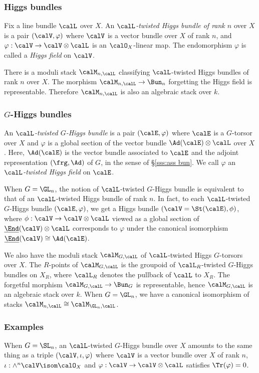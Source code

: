 \subsubsection{Higgs bundles} Fix a line bundle $\calL$ over $X$. An {\em $\calL$-twisted Higgs bundle of rank $n$} over $X$  is a pair $(\calV,\varphi)$ where $\calV$ is a vector bundle over $X$ of rank $n$, and $\varphi:\calV\to\calV\otimes\calL$ is an $\calO_{X}$-linear map. The endomorphism $\varphi$ is called a {\em Higgs field} on $\calV$.

There is a moduli stack $\calM_{n,\calL}$ classifying $\calL$-twisted Higgs bundles of rank $n$ over $X$. The morphism $\calM_{n,\calL}\to \Bun_{n}$ forgetting the Higgs field is representable. Therefore $\calM_{n,\calL}$ is also an algebraic stack over $k$.


\subsubsection{$G$-Higgs bundles} An {\em $\calL$-twisted $G$-Higgs bundle} is a pair $(\calE,\varphi)$ where $\calE$ is a $G$-torsor over $X$ and $\varphi$ is a global section of the vector bundle $\Ad(\calE)\otimes\calL$ over $X$. Here, $\Ad(\calE)$ is the vector bundle associated to $\calE$ and the adjoint representation $(\frg,\Ad)$ of $G$, in the sense of \S\ref{sss:ass bun}. We call $\varphi$ an {\em $\calL$-twisted Higgs field} on $\calE$.

When $G=\GL_{n}$, the notion of $\calL$-twisted $G$-Higgs bundle is equivalent to that of an $\calL$-twisted Higgs bundle of rank $n$. In fact, to each $\calL$-twisted $G$-Higgs bundle $(\calE,\varphi)$, we get a Higgs bundle $(\calV=\St(\calE),\phi)$, where $\phi:\calV\to\calV\otimes\calL$ viewed as a global section of $\underline{\End}(\calV)\otimes\calL$ corresponds to $\varphi$ under the canonical isomorphism $\underline{\End}(\calV)\cong\Ad(\calE)$.

We also have the moduli stack $\calM_{G,\calL}$ of $\calL$-twisted Higgs $G$-torsors over $X$. The $R$-points of $\calM_{G,\calL}$ is the groupoid of $\calL_{R}$-twisted $G$-Higgs bundles on $X_{R}$, where $\calL_{R}$ denotes the pullback of $\calL$ to $X_{R}$. The forgetful morphism $\calM_{G,\calL}\to \Bun_{G}$ is representable, hence $\calM_{G,\calL}$ is an algebraic stack over $k$. When $G=\GL_{n}$, we have a canonical isomorphism of stacks $\calM_{n,\calL}\cong\calM_{\GL_{n},\calL}$. 

\subsubsection{Examples} When $G=\SL_{n}$, an $\calL$-twisted $G$-Higgs bundle over $X$ amounts to the same thing as a triple $(\calV,\iota,\varphi)$ where $\calV$ is a vector bundle over $X$ of rank $n$, $\iota:\wedge^{n}\calV\isom\calO_{X}$ and $\varphi: \calV\to\calV\otimes\calL$ satisfies $\Tr(\varphi)=0$.

